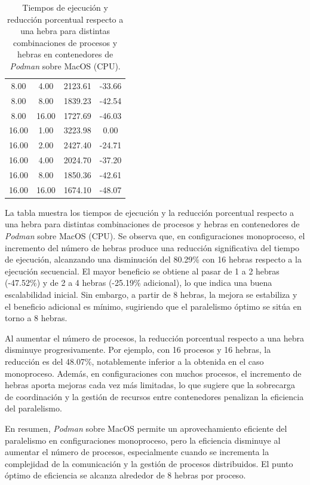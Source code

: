 \begin{table}[ht]
\begin{tabular}{|c|c|c|c|}
        8.00              & 4.00            & 2123.61             & -33.66                         \\
        8.00              & 8.00            & 1839.23             & -42.54                         \\
        8.00              & 16.00           & 1727.69             & -46.03                         \\
        16.00             & 1.00            & 3223.98             & 0.00                           \\
        16.00             & 2.00            & 2427.40             & -24.71                         \\
        16.00             & 4.00            & 2024.70             & -37.20                         \\
        16.00             & 8.00            & 1850.36             & -42.61                         \\
        16.00             & 16.00           & 1674.10             & -48.07                         \\
        \hline
    \end{tabular}
    \caption{Tiempos de ejecución y reducción porcentual respecto a una hebra para distintas combinaciones de procesos y hebras en contenedores de \textit{Podman} sobre MacOS (CPU).}
    \label{tab:thread_sweep_mac_podman_time}
\end{table}

La tabla muestra los tiempos de ejecución y la reducción porcentual respecto a una hebra para distintas combinaciones de procesos y hebras en contenedores de \textit{Podman} sobre MacOS (CPU). Se observa que, en configuraciones monoproceso, el incremento del número de hebras produce una reducción significativa del tiempo de ejecución, alcanzando una disminución del 80.29\% con 16 hebras respecto a la ejecución secuencial. El mayor beneficio se obtiene al pasar de 1 a 2 hebras (-47.52\%) y de 2 a 4 hebras (-25.19\% adicional), lo que indica una buena escalabilidad inicial. Sin embargo, a partir de 8 hebras, la mejora se estabiliza y el beneficio adicional es mínimo, sugiriendo que el paralelismo óptimo se sitúa en torno a 8 hebras.

Al aumentar el número de procesos, la reducción porcentual respecto a una hebra disminuye progresivamente. Por ejemplo, con 16 procesos y 16 hebras, la reducción es del 48.07\%, notablemente inferior a la obtenida en el caso monoproceso. Además, en configuraciones con muchos procesos, el incremento de hebras aporta mejoras cada vez más limitadas, lo que sugiere que la sobrecarga de coordinación y la gestión de recursos entre contenedores penalizan la eficiencia del paralelismo.

En resumen, \textit{Podman} sobre MacOS permite un aprovechamiento eficiente del paralelismo en configuraciones monoproceso, pero la eficiencia disminuye al aumentar el número de procesos, especialmente cuando se incrementa la complejidad de la comunicación y la gestión de procesos distribuidos. El punto óptimo de eficiencia se alcanza alrededor de 8 hebras por proceso.
